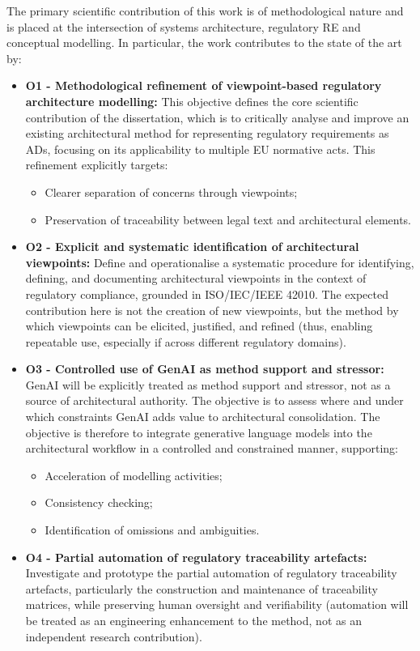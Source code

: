 The primary scientific contribution of this work is of methodological nature and is placed at the intersection of systems architecture, regulatory \ac{RE} and conceptual modelling. In particular, the work contributes to the state of the art by:
\begin{itemize}
    \item \textbf{O1 - Methodological refinement of viewpoint-based regulatory architecture modelling:} This objective defines the core scientific contribution of the dissertation, which is to critically analyse and improve an existing architectural method for representing regulatory requirements as \ac{AD}s, focusing on its applicability to multiple EU normative acts. This refinement explicitly targets:
    \begin{itemize}
        \item Clearer separation of concerns through viewpoints;
        \item Preservation of traceability between legal text and architectural elements.
    \end{itemize}
    \item \textbf{O2 - Explicit and systematic identification of architectural viewpoints:} Define and operationalise a systematic procedure for identifying, defining, and documenting architectural viewpoints in the context of regulatory compliance, grounded in ISO/IEC/IEEE 42010. The expected contribution here is not the creation of new viewpoints, but the method by which viewpoints can be elicited, justified, and refined (thus, enabling repeatable use, especially if across different regulatory domains).
    \item \textbf{O3 - Controlled use of GenAI as method support and stressor:} \ac{GenAI} will be explicitly treated as method support and stressor, not as a source of architectural authority. The objective is to assess where and under which constraints \ac{GenAI} adds value to architectural consolidation. The objective is therefore to integrate generative language models into the architectural workflow in a controlled and constrained manner, supporting:
    \begin{itemize}
        \item Acceleration of modelling activities;
        \item Consistency checking;
        \item Identification of omissions and ambiguities.
    \end{itemize}
    \item \textbf{O4 - Partial automation of regulatory traceability artefacts:} Investigate and prototype the partial automation of regulatory traceability artefacts, particularly the construction and maintenance of traceability matrices, while preserving human oversight and verifiability (automation will be treated as an engineering enhancement to the method, not as an independent research contribution).

\end{itemize}

